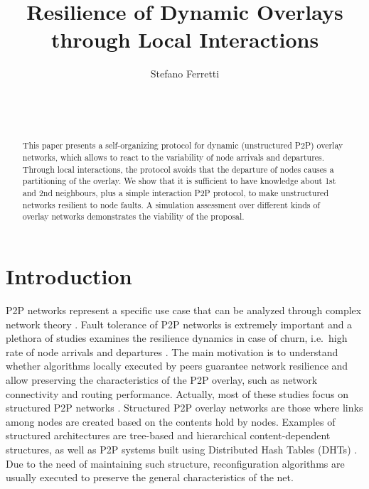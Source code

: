 \documentclass{www13-companion-accepted}
\begin{document}
\title{Resilience of Dynamic Overlays through Local Interactions}


\author{
\alignauthor
Stefano Ferretti\\
       \\
       \\
       \\
}


\maketitle              


\begin{abstract}
This paper presents a self-organizing protocol for dynamic (unstructured P2P) overlay networks, which allows to react to the variability of node arrivals and departures.
Through local interactions, the protocol avoids that the departure of nodes causes a partitioning of the overlay. We show that it is sufficient to have knowledge about 1st and 2nd neighbours, plus a simple interaction P2P protocol, to make unstructured networks resilient to node faults.
A simulation assessment over different kinds of overlay networks demonstrates the viability of the proposal.
\end{abstract}



\section{Introduction}

\ac{P2P} networks represent a specific use case that can be analyzed through complex network theory \cite{gridpeer,simplex}.
Fault tolerance of \ac{P2P} networks is extremely important and a plethora of studies examines the resilience dynamics in case of churn, i.e.~high rate of node arrivals and departures \cite{Loguinov:2003,Luciano1}. The main motivation is to understand whether algorithms locally executed by peers guarantee network resilience and allow preserving the characteristics of the P2P overlay, such as network connectivity and routing performance. 
Actually, most of these studies focus on structured P2P networks \cite{Kong:2008,Wang:2006}.
Structured \ac{P2P} overlay networks are those where links among nodes are created based on the contents hold by nodes. Examples of structured architectures are tree-based and hierarchical content-dependent structures, as well as \ac{P2P} systems built using Distributed Hash Tables (DHTs) \cite{Basu05nodewiz,Cai03maan,Hidalgo:2011}. 
Due to the need of maintaining such structure, reconfiguration algorithms are usually executed to preserve the general characteristics of the net.
\end{document}

